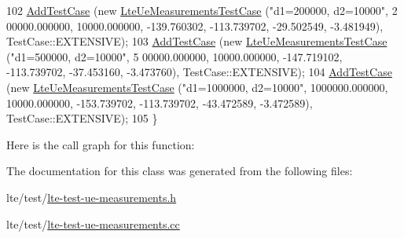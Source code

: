 \begin{DoxyCode}
102   \hyperlink{classns3_1_1TestCase_a3718088e3eefd5d6454569d2e0ddd835}{AddTestCase} (\textcolor{keyword}{new} \hyperlink{classLteUeMeasurementsTestCase}{LteUeMeasurementsTestCase} (\textcolor{stringliteral}{"d1=200000, d2=10000"},  2
      00000.000000, 10000.000000, -139.760302, -113.739702, -29.502549, -3.481949), TestCase::EXTENSIVE);
103   \hyperlink{classns3_1_1TestCase_a3718088e3eefd5d6454569d2e0ddd835}{AddTestCase} (\textcolor{keyword}{new} \hyperlink{classLteUeMeasurementsTestCase}{LteUeMeasurementsTestCase} (\textcolor{stringliteral}{"d1=500000, d2=10000"},  5
      00000.000000, 10000.000000, -147.719102, -113.739702, -37.453160, -3.473760), TestCase::EXTENSIVE);
104   \hyperlink{classns3_1_1TestCase_a3718088e3eefd5d6454569d2e0ddd835}{AddTestCase} (\textcolor{keyword}{new} \hyperlink{classLteUeMeasurementsTestCase}{LteUeMeasurementsTestCase} (\textcolor{stringliteral}{"d1=1000000, d2=10000"},  
      1000000.000000, 10000.000000, -153.739702, -113.739702, -43.472589, -3.472589), TestCase::EXTENSIVE);
105 \}
\end{DoxyCode}


Here is the call graph for this function\+:




The documentation for this class was generated from the following files\+:\begin{DoxyCompactItemize}
\item 
lte/test/\hyperlink{lte-test-ue-measurements_8h}{lte-\/test-\/ue-\/measurements.\+h}\item 
lte/test/\hyperlink{lte-test-ue-measurements_8cc}{lte-\/test-\/ue-\/measurements.\+cc}\end{DoxyCompactItemize}

